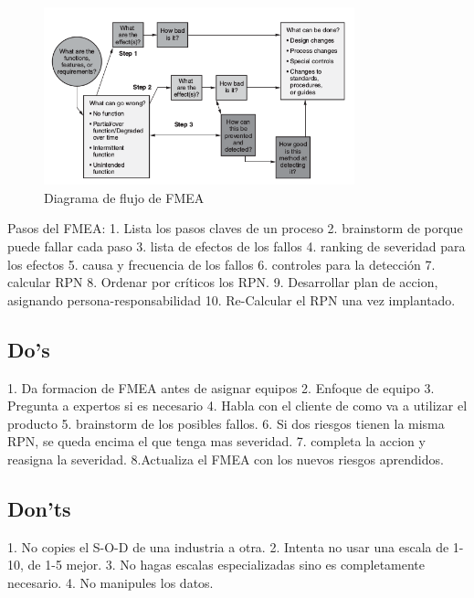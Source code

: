 \documentclass[]{article}
\begin{document}
\begin{figure}[ht!]
	\centering
	\includegraphics[width=90mm]{imagenes/FMEAFlowchart.png}
	\caption{Diagrama de flujo de FMEA}
	\label{fig:FMAFlowchart}
\end{figure}

Pasos del FMEA: 1. Lista los pasos claves de un proceso 2. brainstorm de porque puede fallar cada paso 3. lista de efectos de los fallos 4. ranking de severidad para los efectos 5. causa y frecuencia de los fallos 6. controles para la detección 7. calcular RPN 8. Ordenar por críticos los RPN. 9. Desarrollar plan de accion, asignando persona-responsabilidad 10. Re-Calcular el RPN una vez implantado.

\subsection{Do's} 1. Da formacion de FMEA antes de asignar equipos 2. Enfoque de equipo 3. Pregunta a expertos si es necesario 4. Habla con el cliente de como va a utilizar el producto 5. brainstorm de los posibles fallos. 6. Si dos riesgos tienen la misma RPN, se queda encima el que tenga mas severidad. 7. completa la accion y reasigna la severidad. 8.Actualiza el FMEA con los nuevos riesgos aprendidos.

\subsection{Don'ts} 1. No copies el S-O-D de una industria a otra. 2. Intenta no usar una escala de 1-10, de 1-5 mejor. 3. No hagas escalas especializadas sino es completamente necesario. 4.	No manipules los datos.
\end{document}
